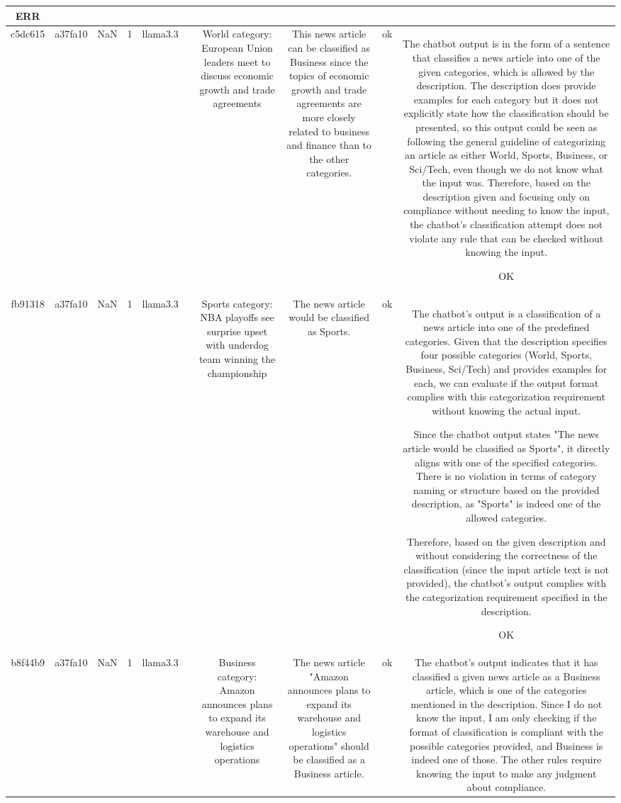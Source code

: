 \begin{table}[h!]
\begin{tabular}{|c|c|c|c|c|c|c|c|c|c|}
ERR\\
\hline
c5dc615 & a37fa10 & NaN & 1 & llama3.3 &  & World category: European Union leaders meet to discuss economic growth and trade agreements & This news article can be classified as Business since the topics of economic growth and trade agreements are more closely related to business and finance than to the other categories. & ok & The chatbot output is in the form of a sentence that classifies a news article into one of the given categories, which is allowed by the description. The description does provide examples for each category but it does not explicitly state how the classification should be presented, so this output could be seen as following the general guideline of categorizing an article as either World, Sports, Business, or Sci/Tech, even though we do not know what the input was. Therefore, based on the description given and focusing only on compliance without needing to know the input, the chatbot's classification attempt does not violate any rule that can be checked without knowing the input.

OK\\
\hline
fb91318 & a37fa10 & NaN & 1 & llama3.3 &  & Sports category: NBA playoffs see surprise upset with underdog team winning the championship & The news article would be classified as Sports. & ok & The chatbot's output is a classification of a news article into one of the predefined categories. Given that the description specifies four possible categories (World, Sports, Business, Sci/Tech) and provides examples for each, we can evaluate if the output format complies with this categorization requirement without knowing the actual input.

Since the chatbot output states "The news article would be classified as Sports", it directly aligns with one of the specified categories. There is no violation in terms of category naming or structure based on the provided description, as "Sports" is indeed one of the allowed categories.

Therefore, based on the given description and without considering the correctness of the classification (since the input article text is not provided), the chatbot's output complies with the categorization requirement specified in the description.

OK\\
\hline
b8f44b9 & a37fa10 & NaN & 1 & llama3.3 &  & Business category: Amazon announces plans to expand its warehouse and logistics operations & The news article "Amazon announces plans to expand its warehouse and logistics operations" should be classified as a Business article. & ok & The chatbot's output indicates that it has classified a given news article as a Business article, which is one of the categories mentioned in the description. Since I do not know the input, I am only checking if the format of classification is compliant with the possible categories provided, and Business is indeed one of those. The other rules require knowing the input to make any judgment about compliance.


\end{tabular}
\end{table}
